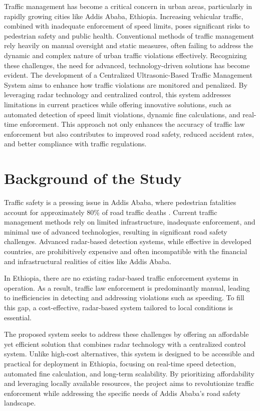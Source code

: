 Traffic management has become a critical concern in urban areas, particularly in rapidly growing cities like Addis Ababa, Ethiopia. Increasing vehicular traffic, combined with inadequate enforcement of speed limits, poses significant risks to pedestrian safety and public health. Conventional methods of traffic management rely heavily on manual oversight and static measures, often failing to address the dynamic and complex nature of urban traffic violations effectively. Recognizing these challenges, the need for advanced, technology-driven solutions has become evident.
The development of a Centralized Ultrasonic-Based Traffic Management System aims to enhance how traffic violations are monitored and penalized. By leveraging radar technology and centralized control, this system addresses limitations in current practices while offering innovative solutions, such as automated detection of speed limit violations, dynamic fine calculations, and real-time enforcement. This approach not only enhances the accuracy of traffic law enforcement but also contributes to improved road safety, reduced accident rates, and better compliance with traffic regulations.


\section{Background of the Study}
Traffic safety is a pressing issue in Addis Ababa, where pedestrian fatalities account for approximately 80\% of road traffic deaths \cite{unece2021}. Current traffic management methods rely on limited infrastructure, inadequate enforcement, and minimal use of advanced technologies, resulting in significant road safety challenges. Advanced radar-based detection systems, while effective in developed countries, are prohibitively expensive and often incompatible with the financial and infrastructural realities of cities like Addis Ababa.

In Ethiopia, there are no existing radar-based traffic enforcement systems in operation. As a result, traffic law enforcement is predominantly manual, leading to inefficiencies in detecting and addressing violations such as speeding. To fill this gap, a cost-effective, radar-based system tailored to local conditions is essential.

The proposed system seeks to address these challenges by offering an affordable yet efficient solution that combines radar technology with a centralized control system. Unlike high-cost alternatives, this system is designed to be accessible and practical for deployment in Ethiopia, focusing on real-time speed detection, automated fine calculation, and long-term scalability. By prioritizing affordability and leveraging locally available resources, the project aims to revolutionize traffic enforcement while addressing the specific needs of Addis Ababa's road safety landscape.

